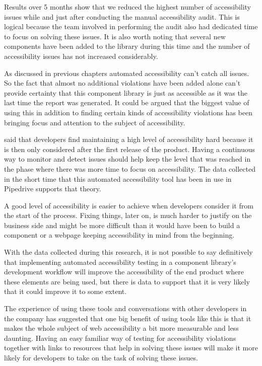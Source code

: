 \documentclass{master_thesis}
\begin{document}
Results over 5 months show that we reduced the highest number of accessibility issues while and just after conducting the manual accessibility audit. This is logical because the team involved in performing the audit also had dedicated time to focus on solving these issues. It is also worth noting that several new components have been added to the library during this time and the number of accessibility issues has not increased considerably.

As discussed in previous chapters automated accessibility can't catch all issues. So the fact that almost no additional violations have been added alone can't provide certainty that this component library is just as accessible as it was the last time the report was generated. It could be argued that the biggest value of using this in addition to finding certain kinds of accessibility violations has been bringing focus and attention to the subject of accessibility.

\citeauthor{Paterno2020} said that developers find maintaining a high level of accessibility hard because it is then only considered after the first release of the product. Having a continuous way to monitor and detect issues should help keep the level that was reached in the phase where there was more time to focus on accessibility. The data collected in the short time that this automated accessibility tool has been in use in Pipedrive supports that theory.

A good level of accessibility is easier to achieve when developers consider it from the start of the process. Fixing things, later on, is much harder to justify on the business side and might be more difficult than it would have been to build a component or a webpage keeping accessibility in mind from the beginning.

With the data collected during this research, it is not possible to say definitively that implementing automated accessibility testing in a component library's development workflow will improve the accessibility of the end product where these elements are being used, but there is data to support that it is very likely that it could improve it to some extent.

The experience of using these tools and conversations with other developers in the company has suggested that one big benefit of using tools like this is that it makes the whole subject of web accessibility a bit more measurable and less daunting. Having an easy familiar way of testing for accessibility violations together with links to resources that help in solving these issues will make it more likely for developers to take on the task of solving these issues.
\end{document}
